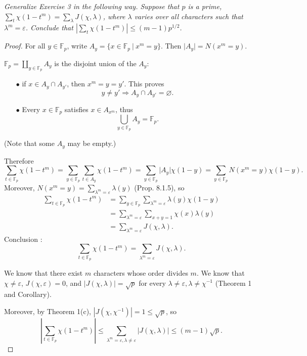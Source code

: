 \documentclass[11pt,a4paper]{article}
\newcommand{\F}{\mathbb{F}}
\begin{document}
{{\it Generalize Exercise 3 in the following way. Suppose that $p$ is a prime, $\sum_t \chi(1-t^m) = \sum_{\lambda} J(\chi,\lambda)$, where $\lambda$ varies over all characters such that $\lambda^m = \varepsilon$. Conclude that $\left | \sum_t \chi(1-t^m) \right | \leq (m-1)p^{1/2}$.

}

\begin{proof}
For all $y \in \F_p$, write  $A_y =\{x \in \mathbb{F}_p\ \vert \ x^m = y\}$. Then $\vert A_y\vert = N(x^m = y)$.

$\mathbb{F}_p = \coprod\limits_{y \in \mathbb{F}_p} A_y$ is the disjoint union of the $A_y$:

\begin{enumerate}
\item[$\bullet$] if $x \in A_y \cap A_{y'}$, then $x^m = y = y'$. This proves
$$y \ne y' \Rightarrow A_y \cap A_{y'} = \varnothing.$$
\item[$\bullet$] Every $x \in \F_p$ satisfies $x \in A_{x^m}$, thus
$$\bigcup_{y \in \F_p} A_y = \F_p.$$
\end{enumerate}
(Note that some $A_y$ may be empty.)

Therefore
$$\sum_{t\in \mathbb{F}_p} \chi(1-t^m) = \sum_{y\in \mathbb{F}_p} \sum\limits_{t \in A_y} \chi(1-t^m) = \sum_{y\in \mathbb{F}_p} \vert A_y \vert \chi(1-y) =\sum_{y\in \mathbb{F}_p} N(x^m = y) \chi(1-y).$$
Moreover, $N(x^m=y) = \sum\limits_{\lambda^m = \varepsilon} \lambda(y)$ (Prop. 8.1.5), so
\begin{align*}
\sum_{t\in \mathbb{F}_p} \chi(1-t^m) &= \sum_{y\in \mathbb{F}_p}  \sum_{\lambda^m = \varepsilon} \lambda(y)  \chi(1-y)\\
& =  \sum\limits_{\lambda^m = \varepsilon}  \sum\limits_{x+y=1} \chi(x) \lambda(y)\\
& = \sum\limits_{\lambda^m = \varepsilon} J(\chi,\lambda).
\end{align*}
Conclusion : $$\sum\limits_{t\in \mathbb{F}_p} \chi(1-t^m) = \sum\limits_{\lambda^m = \varepsilon} J(\chi,\lambda).$$

We know that there exist $m$ characters whose order divides $m$. We know that $\chi \ne \varepsilon$, $J(\chi,\varepsilon)=0$, and  $\vert J(\chi,\lambda) \vert = \sqrt{p}$ for every $\lambda \ne \varepsilon,\lambda\ne \chi^{-1}$ (Theorem 1 and Corollary).

Moreover, by Theorem 1(c), $|J(\chi,\chi^{-1})|  = 1 \leq \sqrt{p}$, so
$$\left \vert \sum_{t\in \mathbb{F}_p} \chi(1-t^m)\right  \vert \leq \sum_{\lambda^m = \varepsilon, \lambda \neq \varepsilon} \vert J(\chi,\lambda) \vert \leq  (m-1)\sqrt{p}.$$
\end{proof}

}
\end{document}
